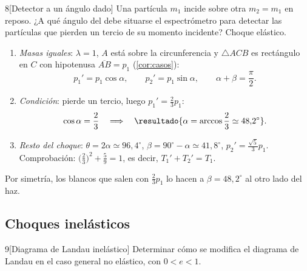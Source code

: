 \begin{problema}{8}[Detector a un ángulo dado]
\label{prob:8}
Una partícula $m_{1}$ incide sobre otra $m_{2}=m_{1}$ en reposo. ¿A qué ángulo del \lab{}
debe situarse el espectrómetro para detectar las partículas que pierden un tercio de
su momento incidente? Choque elástico.
\end{problema}

\begin{resolucion}
\begin{enumerate}
  \item \emph{Masas iguales}: $\lambda=1$, $A$ está sobre la circunferencia y $\triangle ACB$
        es rectángulo en $C$ con hipotenusa $\overline{AB}=p_{1}$ (\cref{cor:casos}):
        \[
          p_{1}'=p_{1}\cos\alpha,\qquad p_{2}'=p_{1}\sin\alpha,\qquad \alpha+\beta=\frac\pi2 .
        \]
  \item \emph{Condición}: pierde un tercio, luego $p_{1}'=\tfrac23p_{1}$:
        \[
          \cos\alpha=\frac23\quad\Longrightarrow\quad\resultado{\alpha=\arccos\frac23\simeq48{,}2^{\circ}} .
        \]
  \item \emph{Resto del choque}: $\theta=2\alpha\simeq96{,}4^{\circ}$, $\beta=90^{\circ}-\alpha\simeq41{,}8^{\circ}$,
        $p_{2}'=\tfrac{\sqrt5}{3}p_{1}$. Comprobación: $\bigl(\tfrac23\bigr)^{2}+\tfrac59=1$, es decir, $T_{1}'+T_{2}'=T_{1}$.
\end{enumerate}
Por simetría, los blancos que salen con $\tfrac23p_{1}$ lo hacen a $\beta=48{,}2^{\circ}$ al otro lado del haz.
\end{resolucion}

\subsection{Choques inelásticos}

\begin{problema}{9}[Diagrama de Landau inelástico]
\label{prob:9}
Determinar cómo se modifica el diagrama de Landau en el caso general no elástico, con $0<e<1$.
\end{problema}

